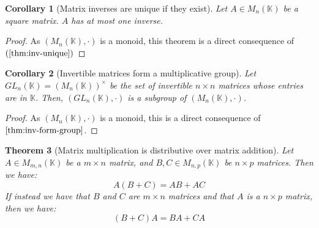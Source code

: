 \documentclass{article}
\newtheorem{theorem}{Theorem}[section]
\newtheorem{corollary}[theorem]{Corollary}
\theoremstyle{definition}
\theoremstyle{remark}
\theoremstyle{example}
\begin{document}
\begin{corollary}[Matrix inverses are unique if they exist]
		Let $A \in M_n(\mathbb{K})$ be a square matrix. $A$ has at most one inverse.
\end{corollary}

\begin{proof}
		As $(M_n(\mathbb{K}), \cdot)$ is a monoid, this theorem is a direct consequence of $(\cite{thm:inv-unique})$
\end{proof}

\begin{corollary}[Invertible matrices form a multiplicative group]
		Let $GL_n(\mathbb{K}) = (M_n(\mathbb{K}))^\times$ be the set of invertible $n \times n$ matrices whose entries are in $\mathbb{K}$. Then, $(GL_n(\mathbb{K}), \cdot)$ is a subgroup of $(M_n(\mathbb{K}), \cdot)$.
\end{corollary}

\begin{proof}
		As $(M_n(\mathbb{K}), \cdot)$ is a monoid, this is a direct consequence of $\ref{thm:inv-form-group}$.
\end{proof}

\begin{theorem}[Matrix multiplication is distributive over matrix addition]
    Let $A \in M_{m,n}(\mathbb{K})$ be a $m \times n$ matrix, and $B, C \in M_{n,p}(\mathbb{K})$ be $n \times p$ matrices. Then we have:
        $$A(B + C) = AB + AC$$
    If instead we have that $B$ and $C$ are $m \times n$ matrices and that $A$ is a $n \times p$ matrix, then we have:
        $$(B + C)A = BA + CA$$
\end{theorem}
\end{document}
